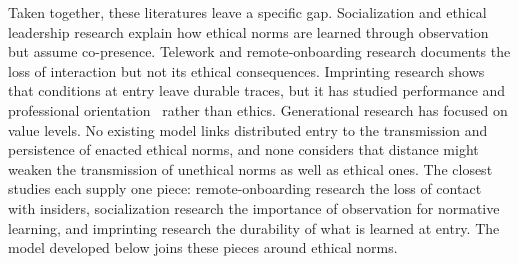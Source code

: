 \medskip

Taken together, these literatures leave a specific gap. Socialization and ethical leadership research explain how ethical norms are learned through observation but assume co-presence. Telework and remote-onboarding research documents the loss of interaction but not its ethical consequences. Imprinting research shows that conditions at entry leave durable traces, but it has studied performance and professional orientation~\citep{tilcsik2014imprint,azoulay2017social} rather than ethics. Generational research has focused on value levels. No existing model links distributed entry to the transmission and persistence of enacted ethical norms, and none considers that distance might weaken the transmission of unethical norms as well as ethical ones. The closest studies each supply one piece: remote-onboarding research the loss of contact with insiders, socialization research the importance of observation for normative learning, and imprinting research the durability of what is learned at entry. The model developed below joins these pieces around ethical norms.
